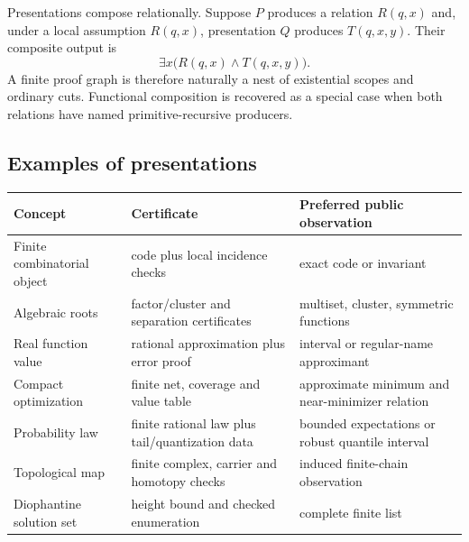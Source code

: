 Presentations compose relationally.  Suppose \(P\) produces a relation
\(R(q,x)\) and, under a local assumption \(R(q,x)\), presentation \(Q\)
produces \(T(q,x,y)\).  Their composite output is
\[
  \exists x\bigl(R(q,x)\wedge T(q,x,y)\bigr).
\]
A finite proof graph is therefore naturally a nest of existential scopes and
ordinary cuts.  Functional composition is recovered as a special case when
both relations have named primitive-recursive producers.

\subsection{Examples of presentations}

\begin{longtable}{@{}p{}p{}p{}@{}}
\toprule
Concept & Certificate & Preferred public observation \\
\midrule
Finite combinatorial object & code plus local incidence checks & exact code or invariant \\
Algebraic roots & factor/cluster and separation certificates & multiset, cluster, symmetric functions \\
Real function value & rational approximation plus error proof & interval or regular-name approximant \\
Compact optimization & finite net, coverage and value table & approximate minimum and near-minimizer relation \\
Probability law & finite rational law plus tail/quantization data & bounded expectations or robust quantile interval \\
Topological map & finite complex, carrier and homotopy checks & induced finite-chain observation \\
Diophantine solution set & height bound and checked enumeration & complete finite list \\
\bottomrule
\end{longtable}
